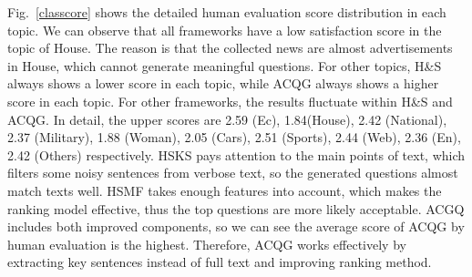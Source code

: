 \documentclass[runningheads,UTF8,article]{comsis2}
\begin{document}
	Fig.~\ref{classcore} shows the detailed human evaluation score distribution in each topic. We can observe that all frameworks have a low satisfaction score in the topic of House. The reason is that the collected news are almost advertisements in House, which cannot generate meaningful questions. For other topics, H\&S always shows a lower score in each topic, while ACQG always shows a higher score in each topic. For other frameworks, the results fluctuate within H\&S and ACQG. In detail, the upper scores are 2.59 (Ec), 1.84(House), 2.42 (National), 2.37 (Military), 1.88 (Woman), 2.05 (Cars), 2.51 (Sports), 2.44 (Web), 2.36 (En), 2.42 (Others) respectively. 
	HSKS pays attention to the main points of text, which filters some noisy sentences from verbose text, so the generated questions almost match texts well. HSMF takes enough features into account, which makes the ranking model effective, thus the top questions are more likely acceptable. ACGQ includes both improved components, so we can see the average score of ACQG by human evaluation is the highest. Therefore, ACQG works effectively by extracting key sentences instead of full text and improving ranking method.
	
	
	
	
	
\end{document}
